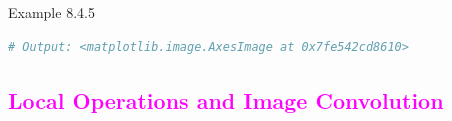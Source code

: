 \documentclass{book}
\begin{document}
\begin{egBox}{Example 8.4.5}{}
\begin{lstlisting}[language=Python, basicstyle=\ttfamily\small, keywordstyle=\color{blue}, commentstyle=\color{forestgreen}, stringstyle=\color{red}, showstringspaces=false]
# Output: <matplotlib.image.AxesImage at 0x7fe542cd8610>
    \end{lstlisting}
    \begin{center}
    \end{center}
\end{egBox}
\newpage
\textcolor{magenta}{\section{\textbf{Local Operations and Image Convolution}}}
\end{document}
